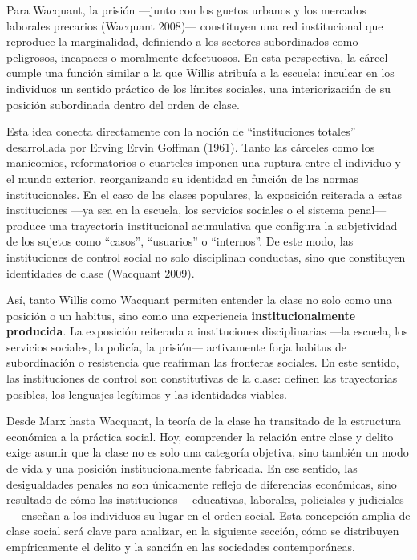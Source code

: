 \documentclass[
  spanish,
  letterpaper,
  DIV=11,
  numbers=noendperiod]{scrreprt}
\begin{document}
Para Wacquant, la prisión ---junto con los guetos urbanos y los mercados
laborales precarios (Wacquant 2008)--- constituyen una red institucional
que reproduce la marginalidad, definiendo a los sectores subordinados
como peligrosos, incapaces o moralmente defectuosos. En esta
perspectiva, la cárcel cumple una función similar a la que Willis
atribuía a la escuela: inculcar en los individuos un sentido práctico de
los límites sociales, una interiorización de su posición subordinada
dentro del orden de clase.

Esta idea conecta directamente con la noción de ``instituciones
totales'' desarrollada por Erving Ervin Goffman (1961). Tanto las
cárceles como los manicomios, reformatorios o cuarteles imponen una
ruptura entre el individuo y el mundo exterior, reorganizando su
identidad en función de las normas institucionales. En el caso de las
clases populares, la exposición reiterada a estas instituciones ---ya
sea en la escuela, los servicios sociales o el sistema penal--- produce
una trayectoria institucional acumulativa que configura la subjetividad
de los sujetos como ``casos'', ``usuarios'' o ``internos''. De este
modo, las instituciones de control social no solo disciplinan conductas,
sino que constituyen identidades de clase (Wacquant 2009).

Así, tanto Willis como Wacquant permiten entender la clase no solo como
una posición o un habitus, sino como una experiencia
\textbf{institucionalmente producida}. La exposición reiterada a
instituciones disciplinarias ---la escuela, los servicios sociales, la
policía, la prisión--- activamente forja habitus de subordinación o
resistencia que reafirman las fronteras sociales. En este sentido, las
instituciones de control son constitutivas de la clase: definen las
trayectorias posibles, los lenguajes legítimos y las identidades
viables.

Desde Marx hasta Wacquant, la teoría de la clase ha transitado de la
estructura económica a la práctica social. Hoy, comprender la relación
entre clase y delito exige asumir que la clase no es solo una categoría
objetiva, sino también un modo de vida y una posición institucionalmente
fabricada. En ese sentido, las desigualdades penales no son únicamente
reflejo de diferencias económicas, sino resultado de cómo las
instituciones ---educativas, laborales, policiales y judiciales---
enseñan a los individuos su lugar en el orden social. Esta concepción
amplia de clase social será clave para analizar, en la siguiente
sección, cómo se distribuyen empíricamente el delito y la sanción en las
sociedades contemporáneas.
\end{document}
